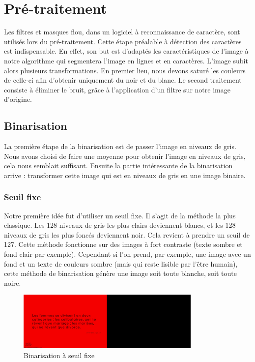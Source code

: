 \documentclass[11pt]{report}
\begin{document}

\chapter{Pré-traitement}

Les filtres et masques flou, dans un logiciel à reconnaissance de caractère, sont utilisés lors du pré-traitement. Cette étape préalable à détection des caractères est indispensable. En effet, son but est d’adaptés les caractéristiques de l'image à notre algorithme qui segmentera l'image en lignes et en caractères. L'image subit alors plusieurs transformations. En premier lieu, nous devons saturé les couleurs de celle-ci afin d'obtenir uniquement du noir et du blanc. Le second traitement consiste à éliminer le bruit, grâce à l'application d'un filtre sur notre image d'origine.

\section{Binarisation}

La première étape de la binarisation est de passer l’image en niveaux de gris. Nous avons choisi de faire une moyenne pour obtenir l’image en niveaux de gris, cela nous semblait suffisant. Ensuite la partie intéressante de la binarisation arrive : transformer cette image qui est en niveaux de gris en une image binaire.

\subsection{Seuil fixe}

Notre première idée fut d'utiliser un seuil fixe. Il s'agit de la méthode la plus classique. Les 128 niveaux de gris les plus clairs deviennent blancs, et les 128 niveaux de gris les plus foncés deviennent noir. Cela revient à prendre un seuil de 127. Cette méthode fonctionne sur des images à fort contraste (texte sombre et fond clair par exemple). Cependant si l'on prend, par exemple, une image avec un fond et un texte de couleurs sombre (mais qui reste lisible par l’être humain), cette méthode de binarisation génère une image soit toute blanche, soit toute noire.

\begin{figure}[htbp]
\centering
\includegraphics[width=9cm]{b_fixed.png}
\caption{Binarisation à seuil fixe}
\end{figure}
\end{document}

